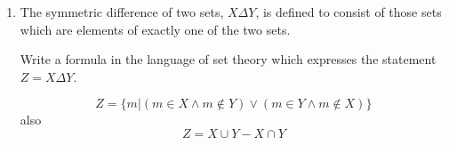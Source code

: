 \documentclass[11pt]{amsart}
\begin{document}
\begin{spacing}{1.2}
\begin{enumerate}
\newpage

\item The symmetric difference of two sets, $X \Delta Y$, is defined to consist of those sets which are elements of exactly one of the two sets.

Write a formula in the language of set theory which expresses the statement $Z = X \Delta Y$.

\vspace{1em}

    \[
        Z = \{m |(m \in X \wedge m \notin Y) \lor (m \in Y \wedge m \notin X)\}
    \]
also
  \[
      Z = X \cup Y - X \cap Y
  \]

\end{enumerate}

\end{spacing}
\end{document}
